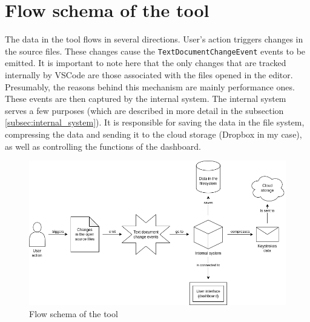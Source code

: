 \section{Flow schema of the tool}

The data in the tool flows in several directions. User's action triggers changes in the source files. These changes cause the \texttt{TextDocumentChangeEvent} \cite{VSCodeAPI} events to be emitted. It is important to note here that the only changes that are tracked internally by VSCode are those associated with the files opened in the editor. Presumably, the reasons behind this mechanism are mainly performance ones. These events are then captured by the internal system. The internal system serves a few purposes (which are described in more detail in the subsection \ref{subsec:internal_system}). It is responsible for saving the data in the file system, compressing the data and sending it to the cloud storage (Dropbox in my case), as well as controlling the functions of the dashboard.

\begin{figure}[ht]
  \centering
  \includegraphics[scale=0.5]{chapters/methodology/graphics/coding-process-tracker.png}
  \caption{Flow schema of the tool}
\end{figure}
